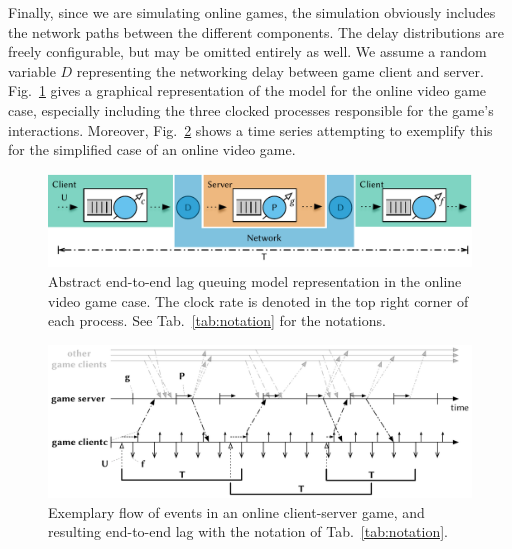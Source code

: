 Finally, since we are simulating online games, the simulation obviously 
includes the network paths between the different components. The delay 
distributions are freely configurable, but may be omitted entirely as well. We assume a random variable $D$ representing the networking delay between game client and server.
Fig.~\ref{fig:queuing-model} gives a graphical representation of the model for the online video game case, especially including the three clocked processes responsible for the game's interactions.
Moreover, Fig.~\ref{fig:tickrate-timeseries} shows a time series attempting to exemplify this for the simplified case of an online video game.

\begin{figure}[!t]
	\centering
	\includegraphics[width=1.0\textwidth]{../models/e2e-lag-model.pdf}
	\caption{Abstract end-to-end lag queuing model representation in the online video game case. The clock rate is denoted in the top right corner of each process. See Tab.~\ref{tab:notation} for the notations.
	}
\label{fig:queuing-model}
\end{figure}


\begin{figure}[!t]
	\centering
	\includegraphics[width=1.0\columnwidth]{../models/tickrate-timeseries-notation.pdf}
	\caption{Exemplary flow of events in an online client-server game, and resulting end-to-end lag with the notation of Tab.~\ref{tab:notation}.
	} %
\label{fig:tickrate-timeseries}
\end{figure}



